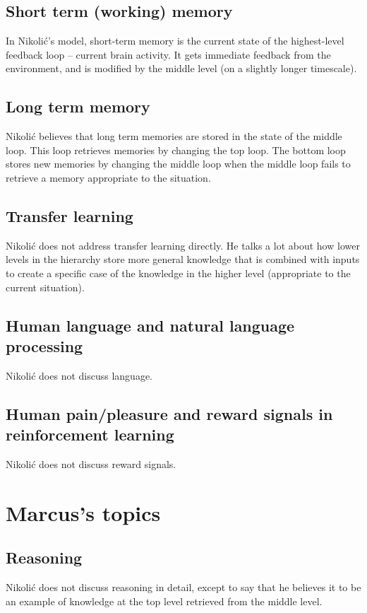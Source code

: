 \documentclass[10pt,a4paper]{article}
\begin{document}
\subsection{Short term (working) memory}
In Nikoli{\'c}'s model, short-term memory is the current state of the highest-level feedback loop -- current brain activity. It gets immediate feedback from the environment, and is modified by the middle level (on a slightly longer timescale).

\subsection{Long term memory}
Nikoli{\'c} believes that long term memories are stored in the state of the middle loop. This loop retrieves memories by changing the top loop. The bottom loop stores new memories by changing the middle loop when the middle loop fails to retrieve a memory appropriate to the situation.

\subsection{Transfer learning}
Nikoli{\'c} does not address transfer learning directly. He talks a lot about how lower levels in the hierarchy store more general knowledge that is combined with inputs to create a specific case of the knowledge in the higher level (appropriate to the current situation).

\subsection{Human language and natural language processing}
Nikoli{\'c} does not discuss language.

\subsection{Human pain/pleasure and reward signals in reinforcement learning}
Nikoli{\'c} does not discuss reward signals.

\section{Marcus's topics}

\subsection{Reasoning}
Nikoli{\'c} does not discuss reasoning in detail, except to say that he believes it to be an example of knowledge at the top level retrieved from the middle level.
\end{document}

